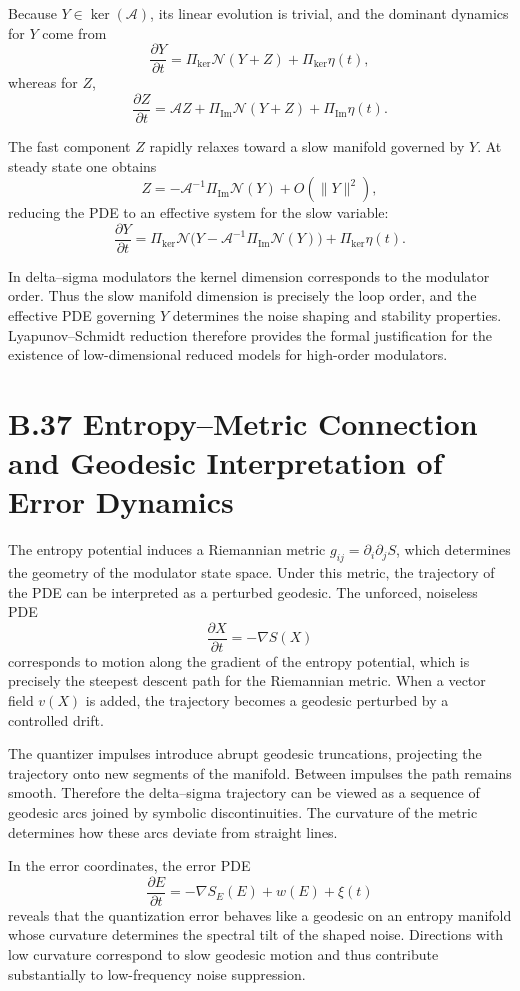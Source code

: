 Because \(Y\in\ker(\mathcal{A})\), its linear evolution is trivial, and the dominant dynamics for \(Y\) come from
\[
\frac{\partial Y}{\partial t}
= \Pi_{\ker}\mathcal{N}(Y+Z) + \Pi_{\ker}\eta(t),
\]
whereas for \(Z\),
\[
\frac{\partial Z}{\partial t}
= \mathcal{A}Z + \Pi_{\mathrm{Im}}\mathcal{N}(Y+Z) + \Pi_{\mathrm{Im}}\eta(t).
\]

The fast component \(Z\) rapidly relaxes toward a slow manifold governed by \(Y\). At steady state one obtains
\[
Z = -\mathcal{A}^{-1}\Pi_{\mathrm{Im}}\mathcal{N}(Y) + O(\|Y\|^{2}),
\]
reducing the PDE to an effective system for the slow variable:
\[
\frac{\partial Y}{\partial t}
= \Pi_{\ker}\mathcal{N}\bigl(Y - \mathcal{A}^{-1}\Pi_{\mathrm{Im}}\mathcal{N}(Y)\bigr)
+ \Pi_{\ker}\eta(t).
\]

In delta–sigma modulators the kernel dimension corresponds to the modulator order. Thus the slow manifold dimension is precisely the loop order, and the effective PDE governing \(Y\) determines the noise shaping and stability properties. Lyapunov–Schmidt reduction therefore provides the formal justification for the existence of low-dimensional reduced models for high-order modulators.

\section{B.37 Entropy–Metric Connection and Geodesic Interpretation of Error Dynamics}

The entropy potential induces a Riemannian metric \(g_{ij} = \partial_{i}\partial_{j} S\), which determines the geometry of the modulator state space. Under this metric, the trajectory of the PDE can be interpreted as a perturbed geodesic. The unforced, noiseless PDE
\[
\frac{\partial X}{\partial t} = -\nabla S(X)
\]
corresponds to motion along the gradient of the entropy potential, which is precisely the steepest descent path for the Riemannian metric. When a vector field \(v(X)\) is added, the trajectory becomes a geodesic perturbed by a controlled drift.

The quantizer impulses introduce abrupt geodesic truncations, projecting the trajectory onto new segments of the manifold. Between impulses the path remains smooth. Therefore the delta–sigma trajectory can be viewed as a sequence of geodesic arcs joined by symbolic discontinuities. The curvature of the metric determines how these arcs deviate from straight lines.

In the error coordinates, the error PDE
\[
\frac{\partial E}{\partial t}
= -\nabla S_{E}(E) + w(E) + \xi(t)
\]
reveals that the quantization error behaves like a geodesic on an entropy manifold whose curvature determines the spectral tilt of the shaped noise. Directions with low curvature correspond to slow geodesic motion and thus contribute substantially to low-frequency noise suppression.

